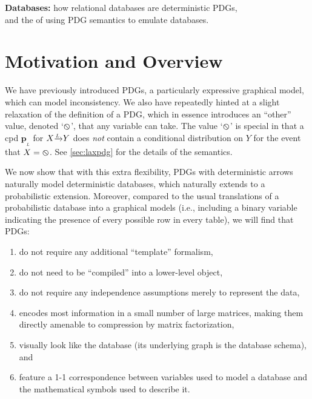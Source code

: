 \documentclass{article}
\theoremstyle{plain}
\theoremstyle{definition}
\theoremstyle{remark}
\newcommand\mat[1]{\mathbf{#1}}
\newcommand{\bp}[1][L]{\mat{p}_{\!_{#1}\!}}
\newcommand{\none}{\varobslash}
\newcommand{\ed}[3]{#2
	\overset{\smash{\mskip-5mu\raisebox{-4.2pt}{\scalebox{0.6}{$#1$}}}}{\raisebox{-0.5pt}{$\xrightarrow{\hphantom{\scalebox{0.6}{$#1$}}}$}} #3}
\begin{document}
\begin{center}
  \textbf{ \Large Databases:} how relational databases are deterministic PDGs,\\
  and the of using PDG semantics to emulate databases.
\end{center}


\tableofcontents
\listoftheorems[onlynamed]

\clearpage
\section{Motivation and Overview}

We have previously introduced PDGs, a particularly expressive graphical model, which can model inconsistency. We also have repeatedly hinted at a slight relaxation of the definition of a PDG, which in essence introduces an ``other'' value, denoted `$\none$', that any variable can take. The value `$\none$' is special in that a cpd $\bp$ for $\ed LXY$ does \textit{not} contain a conditional distribution on $Y$ for the event that $X=\none$. See \cref{sec:laxpdg} for the details of the semantics.

We now show that with this extra flexibility, PDGs with deterministic arrows naturally model deterministic databases, which naturally extends to a probabilistic extension. Moreover, compared to the usual translations of a probabilistic database into a graphical models (i.e., including a binary variable indicating the presence of every possible row in every table), we will find that PDGs:
\begin{enumerate}[nosep]
	\item do not require any additional ``template'' formalism, \label{item:notemplate}
	\item do not need to be ``compiled'' into a lower-level object, \label{item:nocompile}
	\item do not require any independence assumptions merely to represent the data, \label{item:noindepassume}
	\item encodes most information in a small number of large matrices, making them directly amenable to compression by matrix factorization,\label{item:bigmatrix}
	\item visually look like the database (its underlying graph is the database schema), and \label{item:like-a-db}
	\item feature a 1-1 correspondence between variables used to model a database and the mathematical symbols used to describe it. \label{item:fewconcepts}
\end{enumerate}
\end{document}
